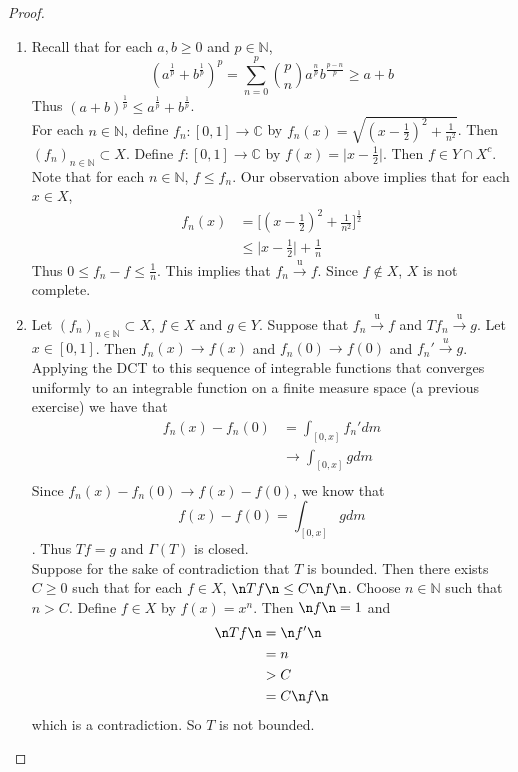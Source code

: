 \documentclass[12pt]{amsart}
\newcommand{\Gam}{\Gamma}
\newcommand{\C}{\mathbb{C}}
\newcommand{\N}{\mathbb{N}}
\newcommand{\convt}[1]{\xrightarrow{\text{#1}}}
\newcommand{\conv}[1]{\xrightarrow{#1}}
\begin{document}
\begin{proof}
	\begin{enumerate}
		\item Recall that for each $a,b \geq 0$ and $p \in \N$, $$(a^{\frac{1}{p}}+b^{\frac{1}{p}})^p = \sum_{n=0}^p  {p \choose n} a^{\frac{n}{p}}b^{\frac{p-n}{p}} \geq a + b$$ Thus $(a+b)^{\frac{1}{p}} \leq a^{\frac{1}{p}}+b^{\frac{1}{p}}$.\\
		For each $n \in \N$, define $f_n: [0,1] \rightarrow \C$ by $f_n(x) = \sqrt{(x-\frac{1}{2})^2+ \frac{1}{n^2}}$. Then $(f_n)_{n \in \N} \subset X$. Define $f:[0,1] \rightarrow \C$ by $f(x) = \vert x-\frac{1}{2}\vert$. Then $f \in Y \cap X^c$. Note that for each $n \in \N$, $f \leq f_n$. Our observation above implies that for each $x \in X$,
		\begin{align*}
			f_n(x) 
			&= \bigg[ (x-\frac{1}{2})^2 + \frac{1}{n^2} \bigg]^{\frac{1}{2}}\\
			& \leq \vert x-\frac{1}{2} \vert + \frac{1}{n}
		\end{align*}
		Thus $0 \leq f_n - f \leq \frac{1}{n} $. This implies that $f_n \convt{u} f$. Since $f \not \in X$, $X$ is not complete. \vspace{.5cm}\\
		\item Let $(f_n)_{n \in \N} \subset X$, $f \in X$ and $g \in Y$. Suppose that $f_n \convt{u} f$ and $Tf_n \convt{u} g$. Let $x \in [0,1]$. Then $f_n(x) \conv{} f(x)$ and $f_n(0) \conv{} f(0)$ and $f_n' \conv{u} g$. Applying the DCT to this sequence of integrable functions that converges uniformly to an integrable function on a finite measure space (a previous exercise) we have that
		\begin{align*}
			f_n(x) - f_n(0) 
			&= \int_{[0,x]} f_n' dm \\
			& \conv{} \int_{[0,x]} g dm \\ 
		\end{align*} 
		Since $f_n(x) - f_n(0) \conv{} f(x) - f(0)$, we know that $$f(x) - f(0) = \int_{[0,x]} g dm$$. Thus $Tf = g$ and $\Gam(T)$ is closed. \\
		Suppose for the sake of contradiction that $T$ is bounded. Then there exists $C \geq 0$ such that for each $f \in X$, $\n T f \n \leq C \n f \n$. Choose $n \in \N$ such that $n > C$. Define $f \in X$ by $f(x) = x^n$. Then $\n f \n = 1$ and 
		\begin{align*}
			\n Tf \n 
			&= \n f' \n \\
			&= n \\
			&> C \\
			&= C \n f \n
		\end{align*}
		which is a contradiction. So $T$ is not bounded.
	\end{enumerate}
\end{proof}
\end{document}
